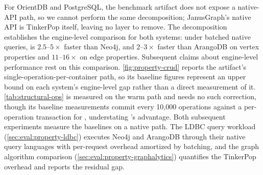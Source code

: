 For OrientDB and PostgreSQL, the benchmark artifact does not expose a native-API path, so we cannot perform the same decomposition; JanusGraph's native API is TinkerPop itself, leaving no layer to remove.
The decomposition establishes the engine-level comparison for both systems: under batched native queries, \project{} is $2.5$--$5\times$ faster than Neo4j, and $2$--$3\times$ faster than ArangoDB on vertex properties and $11$--$16\times$ on edge properties.
Subsequent claims about engine-level performance rest on this comparison.
\autoref{fig:property-crud} reports the artifact's single-operation-per-container path, so its baseline figures represent an upper bound on each system's engine-level gap rather than a direct measurement of it.
\autoref{tab:structural-ops} is measured on the warm path and needs no such correction, though its baseline measurements commit every 10{,}000 operations against a per-operation transaction for \project{}, understating \project{}'s advantage.
Both subsequent experiments measure the baselines on a native path.
The LDBC query workload (\autoref{sec:eval:property-ldbc}) executes Neo4j and ArangoDB through their native query languages with per-request overhead amortized by batching, and the graph algorithm comparison (\autoref{sec:eval:property-graphalytics}) quantifies the TinkerPop overhead and reports the residual gap.
